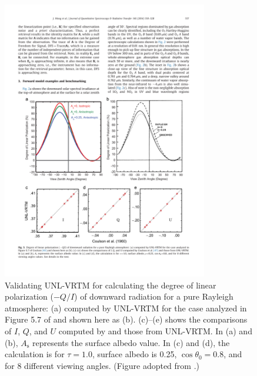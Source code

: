 \begin{figure}[t]
  \centering
  \includegraphics[width={0.8\textwidth}]{figures/unlvrtm2.pdf}
  \caption[Validation of UNL-VRTM for calculating the degree of linear
polarization for a pure Rayleigh atmosphere.]
  {Validating UNL-VRTM for calculating the degree of linear
polarization ($-Q/I$) of downward radiation for a pure Rayleigh 
atmosphere: (a) computed by UNL-VRTM for the case
analyzed in Figure 5.7 of \citet{Coulson88} and shown here as (b). (c)--(e)
shows the comparisons of $I$, $Q$, and $U$ computed by \citet{Coulson60} and
those from UNL-VRTM. In (a) and (b), $A_\text{s}$ represents the surface albedo
value. In (c) and (d), the calculation is for $\tau=1.0$, surface albedo
is 0.25, $\cos{\theta_0}=0.8$, and for 8 different viewing angles.
(Figure adopted from \citet{Wang14}.)}
  \label{fig:unlvrtm2}
\end{figure}

